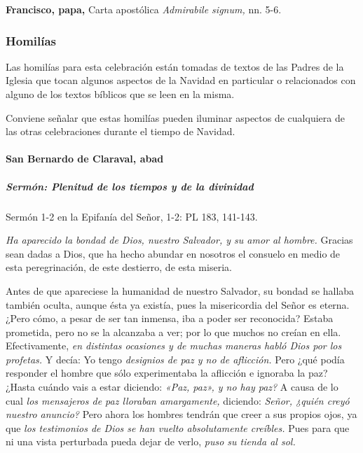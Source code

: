\documentclass[]{article}
\let\oldparagraph\paragraph
\renewcommand{\paragraph}[1]{\oldparagraph{#1}\mbox{}}
\let\oldsubparagraph\subparagraph
\renewcommand{\subparagraph}[1]{\oldsubparagraph{#1}\mbox{}}
\begin{document}
\textbf{Francisco, papa,} Carta apostólica \emph{Admirabile signum,} nn.
5-6.

\subsubsection{Homilías}\label{homiluxedas-6}

Las homilías para esta celebración están tomadas de textos de las Padres
de la Iglesia que tocan algunos aspectos de la Navidad en particular o
relacionados con alguno de los textos bíblicos que se leen en la misma.

Conviene señalar que estas homilías pueden iluminar aspectos de
cualquiera de las otras celebraciones durante el tiempo de Navidad.

\paragraph{San Bernardo de Claraval,
abad}\label{san-bernardo-de-claraval-abad-1}

\subparagraph{Sermón: Plenitud de los tiempos y de la
divinidad}\label{sermuxf3n-plenitud-de-los-tiempos-y-de-la-divinidad}

Sermón 1-2 en la Epifanía del Señor, 1-2: PL 183, 141-143.

\emph{Ha aparecido la bondad de Dios, nuestro Salvador, y su amor al
hombre.} Gracias sean dadas a Dios, que ha hecho abundar en nosotros el
consuelo en medio de esta peregrinación, de este destierro, de esta
miseria.

Antes de que apareciese la humanidad de nuestro Salvador, su bondad se
hallaba también oculta, aunque ésta ya existía, pues la misericordia del
Señor es eterna. ¿Pero cómo, a pesar de ser tan inmensa, iba a poder ser
reconocida? Estaba prometida, pero no se la alcanzaba a ver; por lo que
muchos no creían en ella. Efectivamente, \emph{en distintas ocasiones y
de muchas maneras habló Dios por los profetas.} Y decía: Yo tengo
\emph{designios de paz y no de aflicción.} Pero ¿qué podía responder el
hombre que sólo experimentaba la aflicción e ignoraba la paz? ¿Hasta
cuándo vais a estar diciendo: \emph{«Paz, paz», y no hay paz?} A causa
de lo cual \emph{los mensajeros de paz lloraban amargamente,} diciendo:
\emph{Señor, ¿quién creyó nuestro anuncio?} Pero ahora los hombres
tendrán que creer a sus propios ojos, ya que \emph{los testimonios de
Dios se han vuelto absolutamente creíbles.} Pues para que ni una vista
perturbada pueda dejar de verlo, \emph{puso su tienda al sol.}
\end{document}
